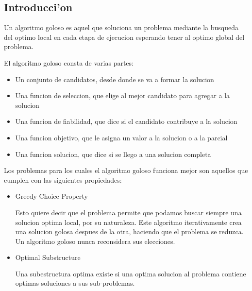 \subsection{Introducci'on}
Un algoritmo goloso es aquel que soluciona un problema mediante la busqueda del optimo local en cada etapa de ejecucion esperando tener al optimo global del
problema.

El algoritmo goloso consta de varias partes:

\begin{itemize}
\item  Un conjunto de candidatos, desde donde se va a formar la solucion
\item  Una funcion de seleccion, que elige al mejor candidato para agregar a la solucion
\item  Una funcion de fiabilidad, que dice si el candidato contribuye a la solucion
\item Una funcion objetivo, que le asigna un valor a la solucion o a la parcial
\item Una funcion solucion, que dice si se llego a una solucion completa

\end{itemize}

Los problemas para los cuales el algoritmo goloso funciona mejor son aquellos que cumplen con las siguientes propiedades:

\begin{itemize}
\item Greedy Choice Property

Esto quiere decir que el problema permite que podamos buscar siempre una solucion optima local, por su naturaleza. Este algoritmo iterativamente crea una 
solucion golosa despues de la otra, haciendo que el problema se reduzca. Un algoritmo goloso nunca reconsidera sus elecciones.

\item  Optimal Substructure 

Una subestructura optima existe si una optima solucion al problema contiene optimas soluciones a sus sub-problemas.

\end{itemize}
